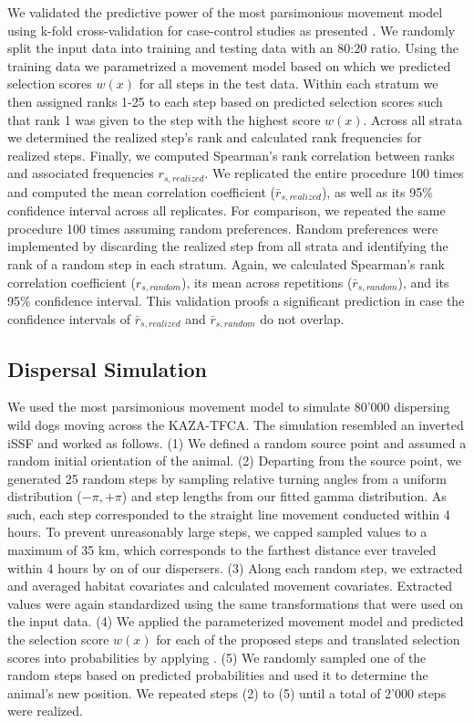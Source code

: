 \documentclass[abstract=on,10pt,a4paper,bibliography=totocnumbered]{article}
\begin{document}
We validated the predictive power of the most parsimonious movement model using
k-fold cross-validation for case-control studies as presented
\cite{Fortin.2009}. We randomly split the input data into training and testing
data with an 80:20 ratio. Using the training data we parametrized a movement
model based on which we predicted selection scores \(w(x)\) for all steps in the
test data. Within each stratum we then assigned ranks 1-25 to each step based on
predicted selection scores such that rank 1 was given to the step with the
highest score \(w(x)\). Across all strata we determined the realized step's rank
and calculated rank frequencies for realized steps. Finally, we computed
Spearman's rank correlation between ranks and associated frequencies \(r_{s,
realized}\). We replicated the entire procedure 100 times and computed the mean
correlation coefficient (\(\bar{r}_{s, realized}\)), as well as its 95\%
confidence interval across all replicates. For comparison, we repeated the same
procedure 100 times assuming random preferences. Random preferences were
implemented by discarding the realized step from all strata and identifying the
rank of a random step in each stratum. Again, we calculated Spearman's rank
correlation coefficient (\(r_{s, random}\)), its mean across repetitions
(\(\bar{r}_{s, random}\)), and its 95\% confidence interval. This validation
proofs a significant prediction in case the confidence intervals of
\(\bar{r}_{s, realized}\) and \(\bar{r}_{s, random}\) do not overlap.

\subsection{Dispersal Simulation}
We used the most parsimonious movement model to simulate 80'000 dispersing wild
dogs moving across the KAZA-TFCA. The simulation resembled an inverted iSSF and
worked as follows. (1) We defined a random source point and assumed a random
initial orientation of the animal. (2) Departing from the source point, we
generated 25 random steps by sampling relative turning angles from a uniform
distribution (\(-\pi, +\pi\)) and step lengths from our fitted gamma
distribution. As such, each step corresponded to the straight line movement
conducted within 4 hours. To prevent unreasonably large steps, we capped sampled
values to a maximum of 35 km, which corresponds to the farthest distance ever
traveled within 4 hours by on of our dispersers. (3) Along each random step, we
extracted and averaged habitat covariates and calculated movement covariates.
Extracted values were again standardized using the same transformations that
were used on the input data. (4) We applied the parameterized movement model and
predicted the selection score \(w(x)\) for each of the proposed steps and
translated selection scores into probabilities by applying . (5) We
randomly sampled one of the random steps based on predicted probabilities and
used it to determine the animal's new position. We repeated steps (2) to (5)
until a total of 2'000 steps were realized.
\end{document}
